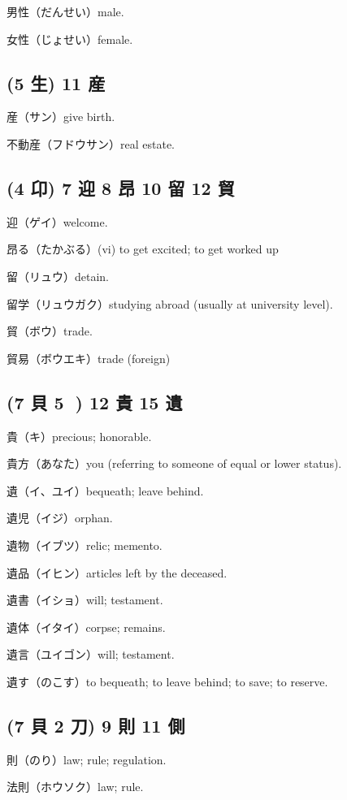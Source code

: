 男性（だんせい）male.

女性（じょせい）female.

\subsection{(5 生) 11 産}

産（サン）give birth.

不動産（フドウサン）real estate.

\subsection{(4 卬) 7 迎 8 昂 10 留 12 貿}

迎（ゲイ）welcome.

昂る（たかぶる）(vi) to get excited; to get worked up

留（リュウ）detain.

留学（リュウガク）studying abroad (usually at university level).

貿（ボウ）trade.

貿易（ボウエキ）trade (foreign)

\subsection{(7 貝 5 𠀐) 12 貴 15 遺}

貴（キ）precious; honorable.

貴方（あなた）you (referring to someone of equal or lower status).

遺（イ、ユイ）bequeath; leave behind.

遺児（イジ）orphan.

遺物（イブツ）relic; memento.

遺品（イヒン）articles left by the deceased.

遺書（イショ）will; testament.

遺体（イタイ）corpse; remains.

遺言（ユイゴン）will; testament.

遺す（のこす）to bequeath; to leave behind; to save; to reserve.

\subsection{(7 貝 2 刀) 9 則 11 側}

則（のり）law; rule; regulation.

法則（ホウソク）law; rule.

